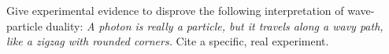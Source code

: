 Give experimental evidence to disprove the following interpretation of wave-particle
duality: \emph{A photon is really a particle, but it travels along a wavy path, like
a zigzag with rounded corners.} Cite a specific, real experiment.
